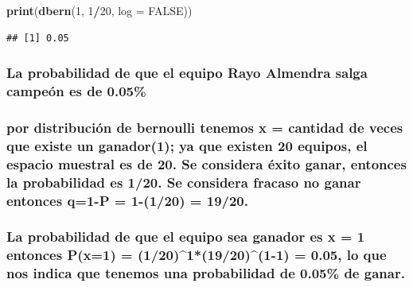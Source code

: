 \documentclass[]{article}
\newenvironment{Shaded}{\begin{snugshade}}{\end{snugshade}}
\newcommand{\DataTypeTok}[1]{\textcolor[rgb]{0.13,0.29,0.53}{#1}}
\newcommand{\DecValTok}[1]{\textcolor[rgb]{0.00,0.00,0.81}{#1}}
\newcommand{\KeywordTok}[1]{\textcolor[rgb]{0.13,0.29,0.53}{\textbf{#1}}}
\newcommand{\NormalTok}[1]{#1}
\newcommand{\OperatorTok}[1]{\textcolor[rgb]{0.81,0.36,0.00}{\textbf{#1}}}
\newcommand{\OtherTok}[1]{\textcolor[rgb]{0.56,0.35,0.01}{#1}}
\begin{document}
\begin{Shaded}
\begin{Highlighting}[]
\KeywordTok{print}\NormalTok{(}\KeywordTok{dbern}\NormalTok{(}\DecValTok{1}\NormalTok{, }\DecValTok{1}\OperatorTok{/}\DecValTok{20}\NormalTok{, }\DataTypeTok{log =} \OtherTok{FALSE}\NormalTok{))}
\end{Highlighting}
\end{Shaded}

\begin{verbatim}
## [1] 0.05
\end{verbatim}

\hypertarget{la-probabilidad-de-que-el-equipo-rayo-almendra-salga-campeon-es-de-0.05}{%
\subsubsection{La probabilidad de que el equipo Rayo Almendra salga
campeón es de
0.05\%}\label{la-probabilidad-de-que-el-equipo-rayo-almendra-salga-campeon-es-de-0.05}}

\hypertarget{por-distribucion-de-bernoulli-tenemos-x-cantidad-de-veces-que-existe-un-ganador1-ya-que-existen-20-equipos-el-espacio-muestral-es-de-20.-se-considera-exito-ganar-entonces-la-probabilidad-es-120.-se-considera-fracaso-no-ganar-entonces-q1-p-1-120-1920.}{%
\subsubsection{por distribución de bernoulli tenemos x = cantidad de
veces que existe un ganador(1); ya que existen 20 equipos, el espacio
muestral es de 20. Se considera éxito ganar, entonces la probabilidad es
1/20. Se considera fracaso no ganar entonces q=1-P = 1-(1/20) =
19/20.}\label{por-distribucion-de-bernoulli-tenemos-x-cantidad-de-veces-que-existe-un-ganador1-ya-que-existen-20-equipos-el-espacio-muestral-es-de-20.-se-considera-exito-ganar-entonces-la-probabilidad-es-120.-se-considera-fracaso-no-ganar-entonces-q1-p-1-120-1920.}}

\hypertarget{la-probabilidad-de-que-el-equipo-sea-ganador-es-x-1-entonces-px1-120119201-1-0.05-lo-que-nos-indica-que-tenemos-una-probabilidad-de-0.05-de-ganar.}{%
\subsubsection{La probabilidad de que el equipo sea ganador es x = 1
entonces P(x=1) = (1/20)\^{}1*(19/20)\^{}(1-1) = 0.05, lo que nos indica
que tenemos una probabilidad de 0.05\% de
ganar.}\label{la-probabilidad-de-que-el-equipo-sea-ganador-es-x-1-entonces-px1-120119201-1-0.05-lo-que-nos-indica-que-tenemos-una-probabilidad-de-0.05-de-ganar.}}
\end{document}
